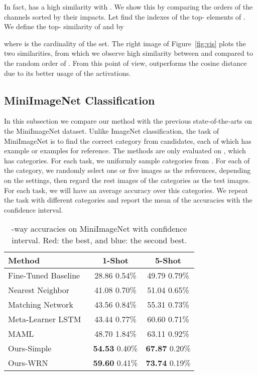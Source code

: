In fact,  has a high similarity with \smash{}. We show this by comparing the orders of the channels sorted by their impacts.
Let  find the indexes of the top- elements of . We define the top- similarity of  and \smash{} by

where  is the cardinality of the set.
The right image of Figure~\ref{fig:vis} plots the two similarities, from which we observe high similarity between  and \smash{} compared to the random order of .
From this point of view,  outperforms the cosine distance due to its better usage of the activations.

\subsection{MiniImageNet Classification}
In this subsection we compare our method with the previous state-of-the-arts on the MiniImageNet dataset.
Unlike ImageNet classification, the task of MiniImageNet is to find the correct category from  candidates, each of which has  example or  examples for reference. The methods are only evaluated on , which has  categories.
For each task, we uniformly sample  categories from .
For each of the category, we randomly select one or five images as the references, depending on the settings, then regard the rest images of the  categories as the test images.
For each task, we will have an average accuracy over this  categories.
We repeat the task with different categories and report the mean of the accuracies with the  confidence interval.

\begin{table}
    \small
    \centering
    \vspace{0.05in}
    \setlength{\tabcolsep}{0.5em}
    \begin{tabular}{lcc}
        \toprule
        Method & 1-Shot & 5-Shot \\
        \midrule
        Fine-Tuned Baseline & 28.86  0.54\% & 49.79  0.79\% \\
        Nearest Neighbor & 41.08  0.70\% & 51.04  0.65\% \\
        Matching Network~\cite{DBLP:conf/nips/VinyalsBLKW16} & 43.56  0.84\% & 55.31  0.73\% \\
        Meta-Learner LSTM~\cite{ravi2017optimization} & 43.44  0.77\% & 60.60  0.71\% \\
        MAML~\cite{pmlr-v70-finn17a} & 48.70  1.84\% & 63.11  0.92\% \\
        \hdashline
        Ours-Simple & {\bf\color{blue}54.53}  0.40\% & {\bf\color{blue}67.87}  0.20\% \\
        Ours-WRN & {\bf\color{red}59.60}  0.41\% & {\bf\color{red}73.74}  0.19\% \\
        \bottomrule
    \end{tabular}
    \caption{-way accuracies on MiniImageNet with  confidence interval. Red: the best, and blue: the second best.}
    \label{tab:mini}
\end{table}

